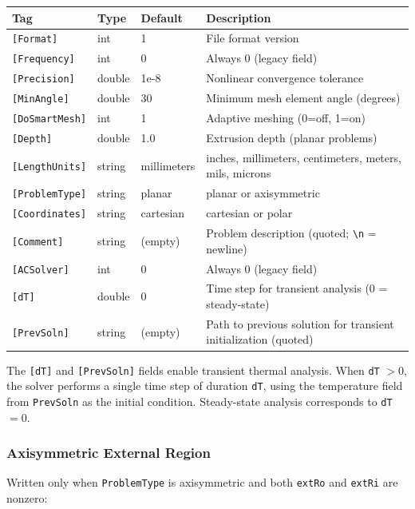 \documentclass[11pt]{article}
\begin{document}
\begin{longtable}{lllp{5.5cm}}
\toprule
Tag & Type & Default & Description \\
\midrule
\endhead
\verb|[Format]|      & int     & 1          & File format version \\
\verb|[Frequency]|   & int     & 0          & Always 0 (legacy field) \\
\verb|[Precision]|   & double  & 1e-8       & Nonlinear convergence tolerance \\
\verb|[MinAngle]|    & double  & 30         & Minimum mesh element angle (degrees) \\
\verb|[DoSmartMesh]| & int     & 1          & Adaptive meshing (0=off, 1=on) \\
\verb|[Depth]|       & double  & 1.0        & Extrusion depth (planar problems) \\
\verb|[LengthUnits]| & string  & millimeters & inches, millimeters, centimeters, meters, mils, microns \\
\verb|[ProblemType]| & string  & planar     & planar or axisymmetric \\
\verb|[Coordinates]| & string  & cartesian  & cartesian or polar \\
\verb|[Comment]|     & string  & (empty)    & Problem description (quoted; \verb|\n| = newline) \\
\verb|[ACSolver]|    & int     & 0          & Always 0 (legacy field) \\
\verb|[dT]|          & double  & 0          & Time step for transient analysis (0 = steady-state) \\
\verb|[PrevSoln]|    & string  & (empty)    & Path to previous solution for transient initialization (quoted) \\
\bottomrule
\end{longtable}

The \verb|[dT]| and \verb|[PrevSoln]| fields enable transient thermal
analysis.  When \verb|dT| $> 0$, the solver performs a single time step
of duration \verb|dT|, using the temperature field from
\verb|PrevSoln| as the initial condition.  Steady-state analysis
corresponds to \verb|dT| $= 0$.

\subsubsection{Axisymmetric External Region}

Written only when \verb|ProblemType| is axisymmetric and both
\verb|extRo| and \verb|extRi| are nonzero:
\end{document}

